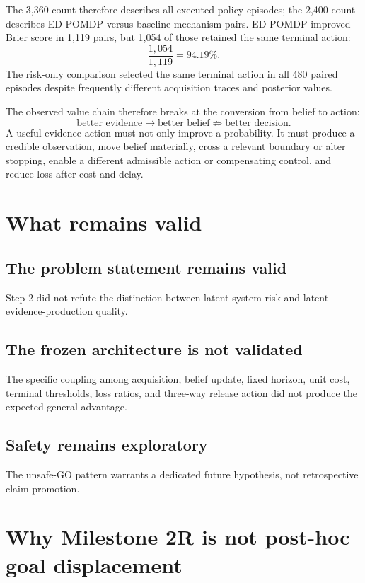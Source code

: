 \documentclass[11pt,a4paper]{article}
\begin{document}
The 3,360 count therefore describes all executed policy episodes; the 2,400 count describes ED-POMDP-versus-baseline mechanism pairs. ED-POMDP improved Brier score in 1,119 pairs, but 1,054 of those retained the same terminal action:
\[
\frac{1{,}054}{1{,}119}=94.19\%.
\]
The risk-only comparison selected the same terminal action in all 480 paired episodes despite frequently different acquisition traces and posterior values.

The observed value chain therefore breaks at the conversion from belief to action:
\[
\text{better evidence}\rightarrow\text{better belief}\not\Rightarrow\text{better decision}.
\]
A useful evidence action must not only improve a probability. It must produce a credible observation, move belief materially, cross a relevant boundary or alter stopping, enable a different admissible action or compensating control, and reduce loss after cost and delay.

\section{What remains valid}

\subsection{The problem statement remains valid}
Step 2 did not refute the distinction between latent system risk and latent evidence-production quality.

\subsection{The frozen architecture is not validated}
The specific coupling among acquisition, belief update, fixed horizon, unit cost, terminal thresholds, loss ratios, and three-way release action did not produce the expected general advantage.

\subsection{Safety remains exploratory}
The unsafe-GO pattern warrants a dedicated future hypothesis, not retrospective claim promotion.

\section{Why Milestone 2R is not post-hoc goal displacement}
\end{document}
